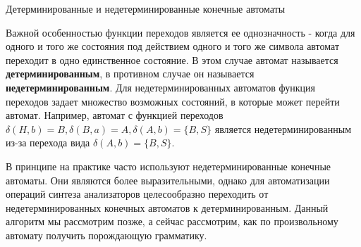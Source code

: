 \documentclass[12pt, pdf, hyperref={unicode},handout]{beamer}
\begin{document}
\begin{frame}{Детерминированные и недетерминированные конечные автоматы}
  \begin{block}

    \small{
      Важной особенностью функции переходов является ее однозначность - когда для одного и того же состояния под действием одного и того же символа автомат переходит в одно единственное состояние. В этом случае автомат называется \textbf{детерминированным}, в противном случае он называется \textbf{недетерминированным}. Для недетерминированных автоматов функция переходов задает множество возможных состояний, в которые может перейти автомат. Например, автомат с функцией переходов $\delta(H,b)=B, \delta(B,a)=A,\delta(A,b)=\{B,S\}$ является недетерминированным из-за перехода вида $\delta(A,b)=\{B,S\}$.

      В принципе на практике часто используют недетерминированные конечные автоматы. Они являются более выразительными, однако для автоматизации операций синтеза анализаторов целесообразно переходить от недетерминированных конечных автоматов к детерминированным. Данный алгоритм мы рассмотрим позже, а сейчас рассмотрим, как по произвольному автомату получить порождающую грамматику.
}

  \end{block}
  
\end{frame}
\end{document}
